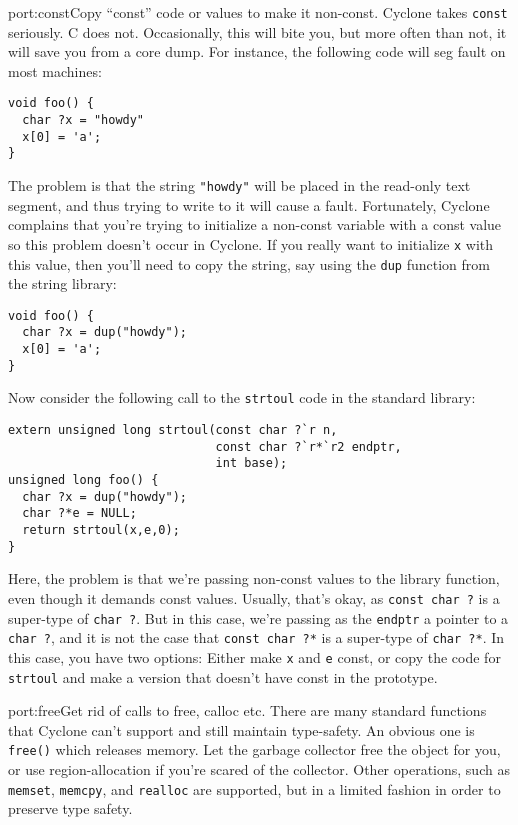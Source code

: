\begin{porta}{port:const}{Copy ``const'' code or values to make it non-const.}
Cyclone takes \texttt{const} seriously.  C does not.  Occasionally,
this will bite you, but more often than not, it will save you from
a core dump.  For instance, the following code will seg fault on
most machines:
\begin{verbatim}
void foo() {
  char ?x = "howdy"
  x[0] = 'a';
}
\end{verbatim}

The problem is that the string \texttt{"howdy"} will be placed in
the read-only text segment, and thus trying to write to it will
cause a fault.  Fortunately, Cyclone complains that you're trying
to initialize a non-const variable with a const value so this
problem doesn't occur in Cyclone.  If you really want to initialize
\texttt{x} with this value, then you'll need to copy the string,
say using the \texttt{dup} function from the string library:
\begin{verbatim}
void foo() {
  char ?x = dup("howdy");
  x[0] = 'a';
}
\end{verbatim}

Now consider the following call to the \texttt{strtoul} code in the
standard library:
\begin{verbatim}
extern unsigned long strtoul(const char ?`r n, 
                             const char ?`r*`r2 endptr,
                             int base);
unsigned long foo() {
  char ?x = dup("howdy");
  char ?*e = NULL;
  return strtoul(x,e,0);
}
\end{verbatim}

Here, the problem is that we're passing non-const values to the
library function, even though it demands const values.  Usually,
that's okay, as \texttt{const char ?} is a super-type of
\texttt{char ?}.  But in this case, we're passing as the
\texttt{endptr} a pointer to a \texttt{char ?}, and it
is not the case that \texttt{const char ?*} is a super-type
of \texttt{char ?*}.  In this case, you have two options:
Either make \texttt{x} and \texttt{e} const, or copy the
code for \texttt{strtoul} and make a version that doesn't
have const in the prototype.  
\end{porta}

\begin{porta}{port:free}{Get rid of calls to free, calloc etc.}
There are many standard functions that Cyclone can't support 
and still maintain type-safety.  An obvious one is \texttt{free()}
which releases memory.  Let the garbage collector free the object
for you, or use region-allocation if you're scared of the collector.
Other operations, such as \texttt{memset}, \texttt{memcpy}, 
and \texttt{realloc} are supported, but in a limited fashion in 
order to preserve  type safety.  
\end{porta}

